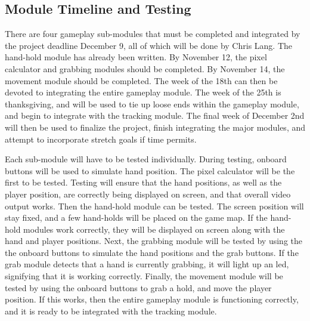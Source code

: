 \subsection{Module Timeline and Testing}

There are four gameplay sub-modules that must be completed and integrated by the project deadline December 9, all of which will be done by Chris Lang. The hand-hold module has already been written. By November 12, the pixel calculator and grabbing modules should be completed. By November 14, the movement module should be completed. The week of the 18th can then be devoted to integrating the entire gameplay module. The week of the 25th is thanksgiving, and will be used to tie up loose ends within the gameplay module, and begin to integrate with the tracking module. The final week of December 2nd will then be used to finalize the project, finish integrating the major modules, and attempt to incorporate stretch goals if time permits.

Each sub-module will have to be tested individually. During testing, onboard buttons will be used to simulate hand position. The pixel calculator will be the first to be tested. Testing will ensure that the hand positions, as well as the player position, are correctly being displayed on screen, and that overall video output works. Then the hand-hold module can be tested. The screen position will stay fixed, and a few hand-holds will be placed on the game map. If the hand-hold modules work correctly, they will be displayed on screen along with the hand and player positions. Next, the grabbing module will be tested by using the the onboard buttons to simulate the hand positions and the grab buttons. If the grab module detects that a hand is currently grabbing, it will light up an led, signifying that it is working correctly. Finally, the movement module will be tested by using the onboard buttons to grab a hold, and move the player position. If this works, then the entire gameplay module is functioning correctly, and it is ready to be integrated with the tracking module. 

